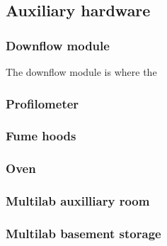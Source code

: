 \subsection{Auxiliary hardware}

\subsubsection{Downflow module}
The downflow module is where the

\subsubsection{Profilometer}

\subsubsection{Fume hoods}

\subsubsection{Oven}

\subsubsection{Multilab auxilliary room}

\subsubsection{Multilab basement storage}
